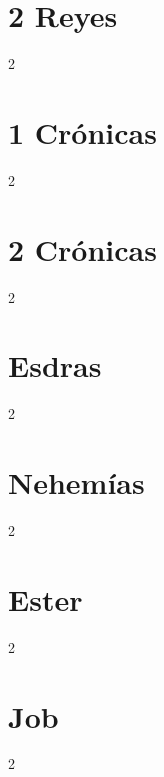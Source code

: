 \chapter{2 Reyes}
\begin{multicols}{2}
  \raggedcolumns
  \parskip=0pt \relax
  
\end{multicols}

\chapter{1 Crónicas}
\begin{multicols}{2}
  \raggedcolumns
  \parskip=0pt \relax
  
\end{multicols}

\chapter{2 Crónicas}
\begin{multicols}{2}
  \raggedcolumns
  \parskip=0pt \relax
  
\end{multicols}

\chapter{Esdras}
\begin{multicols}{2}
  \raggedcolumns
  \parskip=0pt \relax
  
\end{multicols}

\chapter{Nehemías}
\begin{multicols}{2}
  \raggedcolumns
  \parskip=0pt \relax
  
\end{multicols}

\chapter{Ester}
\begin{multicols}{2}
  \raggedcolumns
  \parskip=0pt \relax
  
\end{multicols}

\chapter{Job}
\begin{multicols}{2}
  \raggedcolumns
  \parskip=0pt \relax
  
\end{multicols}

